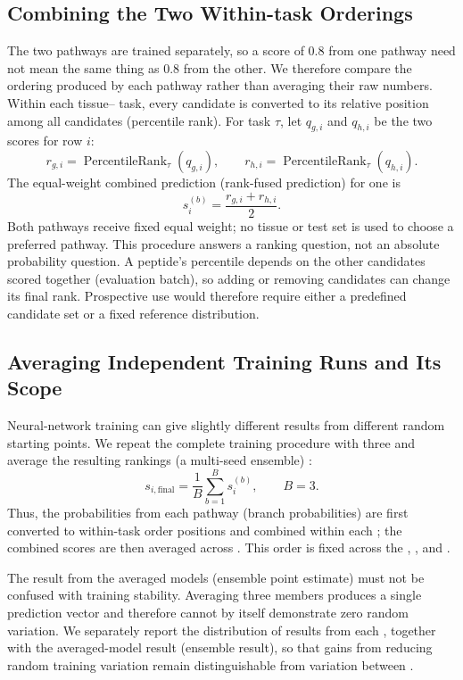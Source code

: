 \subsection{Combining the Two Within-task Orderings}

The two pathways are trained separately, so a score of 0.8 from one pathway need not mean the same thing as 0.8 from the other. We therefore compare the ordering produced by each pathway rather than averaging their raw numbers. Within each tissue--\plainHLA{} task, every candidate is converted to its relative position among all candidates (percentile rank). For task \(\tau\), let \(q_{g,i}\) and \(q_{h,i}\) be the two scores for row \(i\):
\[
r_{g,i}
=
\operatorname{PercentileRank}_{\tau}(q_{g,i}),
\qquad
r_{h,i}
=
\operatorname{PercentileRank}_{\tau}(q_{h,i}).
\]
The equal-weight combined prediction (rank-fused prediction) for one \plainSeed{} is
\[
s_i^{(b)}
=
\frac{r_{g,i}+r_{h,i}}{2}.
\]
Both pathways receive fixed equal weight; no tissue or test set is used to choose a preferred pathway. This procedure answers a ranking question, not an absolute probability question. A peptide's percentile depends on the other candidates scored together (evaluation batch), so adding or removing candidates can change its final rank. Prospective use would therefore require either a predefined candidate set or a fixed reference distribution.

\subsection{Averaging Independent Training Runs and Its Scope}

Neural-network training can give slightly different results from different random starting points. We repeat the complete training procedure with three \plainSeeds{} and average the resulting rankings (a multi-seed ensemble) \cite{lakshminarayanan2017deep}:
\[
s_{i,\mathrm{final}}
=
\frac{1}{B}
\sum_{b=1}^{B}
s_i^{(b)},
\qquad B=3.
\]
Thus, the probabilities from each pathway (branch probabilities) are first converted to within-task order positions and combined within each \plainSeed{}; the combined scores are then averaged across \plainSeeds{}. This order is fixed across the \plainFixedTest{}, \plainPairOOF{}, and \plainPeptideOOF{}.

The result from the averaged models (ensemble point estimate) must not be confused with training stability. Averaging three members produces a single prediction vector and therefore cannot by itself demonstrate zero random variation. We separately report the distribution of results from each \plainSeed{}, together with the averaged-model result (ensemble result), so that gains from reducing random training variation remain distinguishable from variation between \plainSeeds{}.

